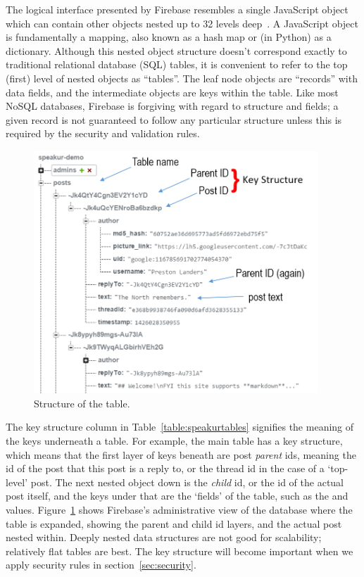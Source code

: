 The logical interface presented by Firebase resembles a single JavaScript object which can contain other objects nested up to 32 levels deep~\cite{firebasecontributors2015}.
A JavaScript object is fundamentally a  mapping, also known as a hash map or (in Python) as a dictionary.
Although this nested object structure doesn't correspond exactly to traditional relational database (SQL) tables, 
it is convenient to refer to the top (first) level of nested objects as ``tables''.
The leaf node objects are ``records'' with data fields, and the intermediate objects are keys within the table.
Like most NoSQL databases, Firebase is forgiving with regard to structure and fields; 
a given record is not guaranteed to follow any particular structure unless this is required by the security and validation rules.

\begin{figure}[htb]
\centering
\includegraphics[width=0.95\textwidth]{images/firebase_admin_posts_b.png}
\caption{Structure of the  table.}
\label{f:firebase_admin_posts}
\end{figure}

The key structure column in Table~\ref{table:speakurtables} signifies the meaning of the keys underneath a table. 
For example, the main  table has a  key structure, 
which means that the first layer of keys beneath  are post \textit{parent} ids, 
meaning the id of the post that this post is a reply to, 
or the thread id in the case of a `top-level' post.
The next nested object down is the \textit{child} id, 
or the id of the actual post itself, 
and the keys under that are the `fields' of the table, 
such as the  and  values.
Figure~\ref{f:firebase_admin_posts} shows Firebase's administrative view of the database where the  table is expanded, 
showing the parent and child id layers, 
and the actual post nested within.
Deeply nested data structures are not good for scalability; 
relatively flat tables are best.
The key structure will become important when we apply security rules in section~\ref{sec:security}.


